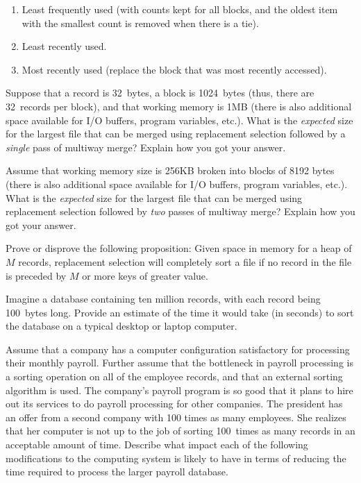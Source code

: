 \begin{exercises}
\begin{enumerate}
\item
Least frequently used (with counts kept for all blocks, and the
oldest item with the smallest count is removed when
there is a tie).

\item
Least recently used.

\item
Most recently used (replace the block that was most recently
accessed).
\end{enumerate}

\item
Suppose that a record is 32~bytes, a block is 1024~bytes
(thus, there are 32~records per block), and that working memory
is 1MB (there is also additional space available for I/O
buffers, program variables, etc.).
What is the \emph{expected} size for the largest file that can
be merged using replacement selection followed by a \emph{single} pass
of multiway  merge?
Explain how you got your answer.

\item
Assume that working memory size is 256KB broken into
blocks of 8192 bytes (there is also additional space available for I/O
buffers, program variables, etc.).
What is the \emph{expected} size for the largest file that can be
merged using replacement selection
followed by \emph{two} passes of
multiway merge?
Explain how you got your answer.

\item
Prove or disprove the following proposition:
Given space in memory for a heap of \(M\)
records,
replacement selection will completely sort a file if no record in the
file is preceded by \(M\) or more keys of greater value.

\item
Imagine a database containing ten million records, with each record
being 100~bytes long.
Provide an estimate of the time it would take (in seconds) to sort the
database on a typical desktop or laptop computer.

\item
Assume that a company has a computer configuration satisfactory for
processing their monthly payroll.
Further assume that the bottleneck in payroll processing is a sorting
operation on all of the employee records, and that an external sorting
algorithm is used.
The company's payroll program is so good that it plans to hire out
its services to do payroll processing for other companies.
The president has an offer from a second company with 100 times as
many employees.
She realizes that her computer is not up to the job of sorting
100~times as many records in an acceptable amount of time.
Describe what impact each of the following modifications to the
computing system is likely to have in terms of reducing the time
required to process the larger payroll database.


\end{exercises}
